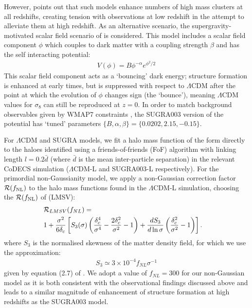 \documentclass[twocolumn,useAMS,usenatbib,usegraphicx]{mn2e}
\newcommand{\rnl}{\mathcal{R}(f_{\rm NL})}
\newcommand{\lcdm}{$\Lambda$CDM }
\begin{document}
However, \cite{Baldi2011} points out that such models enhance
numbers of high mass clusters at all redshifts, creating tension
with observations at low redshift in the attempt to alleviate them
at high redshift. As an alternative scenario, the
supergravity-motivated scalar field scenario of \cite{brax1999d} is
considered. This model includes a scalar field component $\phi$
which couples to dark matter with a coupling strength $\beta$ and
has the self interacting potential:
\begin{eqnarray}
V(\phi) = B\phi^{-\alpha}e^{\phi^2/2}
\end{eqnarray}
This scalar field component acts as a `bouncing' dark energy;
structure formation is enhanced at early times, but is suppressed
with respect to \lcdm after the point at which the evolution of
$\phi$ changes sign (the `bounce'), meaning \lcdm values for
$\sigma_8$ can still be reproduced at $z=0$. In order to match
background observables given by WMAP7 constraints
\citep{Komatsu2011n}, the SUGRA003 version of the potential has
`tuned' parameters $\lbrace B, \alpha, \beta \rbrace = \lbrace
0.0202, 2.15, -0.15 \rbrace$.

For \lcdm and SUGRA models, we fit a halo mass function of the
\cite{Tinker2008} form directly to the haloes identified using a
friends-of-friends (FoF) algorithm with linking length
$l=0.2\bar{d}$ (where $\bar{d}$ is the mean inter-particle
separation) in the relevant CoDECS simulation ($\Lambda$CDM-L and
SUGRA003-L respectively). For the primordial non-Gaussianity model,
we apply a non-Gaussian correction factor $\rnl$ to the halo mass
functions found in the $\Lambda$CDM-L simulation, choosing the
$\rnl$ of \cite{LoVerde2008} (LMSV):
\begin{eqnarray}
\label{eqn:hmf_evs:rlmsv}
\lefteqn{\mathcal{R}_{LMSV}(f_{NL}) =} \nonumber \\
& 1 + \frac{\sigma^2}{6\delta_c}\left[ S_3(\sigma) \left( \frac{\delta_c^4}{\sigma^4} - \frac{2\delta_c^2}{\sigma^2} - 1 \right) + \frac{d S_3}{d \ln\sigma}\left(\frac{\delta_c^2}{\sigma^2} - 1 \right) \right].
\end{eqnarray}
where $S_3$ is the normalised skewness of the matter density field,
for which we use the approximation:
\begin{eqnarray}
\label{eqn:hmf_evs:s3}
S_3 \simeq 3 \times 10^{-4} f_{NL} \sigma^{-1}
\end{eqnarray}
given by equation (2.7) of \cite{Enqvist2011}. We adopt a value of
$f_{NL}=300$ for our non-Gaussian model as it is both consistent
with the observational findings discussed above and leads to a
similar magnitude of enhancement of structure formation at high
redshifts as the SUGRA003 model.
\end{document}
